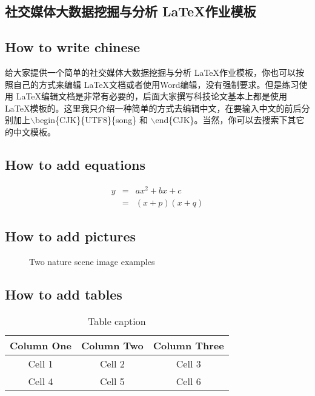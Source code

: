 \documentclass{article}
\begin{document}
\begin{CJK}{UTF8}{song}
 \section{社交媒体大数据挖掘与分析 \LaTeX 作业模板}
\end{CJK}

\subsection{How to write chinese}

\begin{CJK}{UTF8}{song}
 给大家提供一个简单的社交媒体大数据挖掘与分析 \LaTeX 作业模板，你也可以按照自己的方式来编辑 \LaTeX 文档或者使用Word编辑，没有强制要求。但是练习使用 \LaTeX 编辑文档是非常有必要的，后面大家撰写科技论文基本上都是使用\LaTeX 模板的。这里我只介绍一种简单的方式去编辑中文，在要输入中文的前后分别加上$\backslash$begin\{CJK\}\{UTF8\}\{song\} 和 $\backslash$end\{CJK\}。当然，你可以去搜索下其它的中文模板。
\end{CJK}

\subsection{How to add equations}
\begin{eqnarray}
y &=& ax^2+bx+c \nonumber \\
~ &=& (x+p)(x+q)
\end{eqnarray}

\subsection{How to add pictures}

\begin{figure}[htbp]
  \centering
    \caption{Two nature scene image examples}
  \label{fig:imageexample}
\end{figure}

\subsection{How to add tables}
\begin{table}[here]
\begin{center}
\caption{Table caption} \label{tab:cap}
\begin{tabular}{|c|c|c|}
  \hline
  Column One & Column Two & Column Three
  \\
  \hline
  Cell 1 & Cell 2 & Cell 3 \\
  Cell 4 & Cell 5 & Cell 6 \\
  \hline
\end{tabular}
\end{center}
\end{table}
\end{document}
